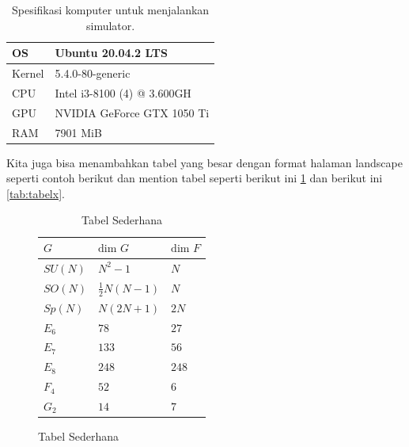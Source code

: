 \begin{longtable}{|p{2cm}|p{7cm}|}
    \caption{Spesifikasi komputer untuk menjalankan simulator.}
    \label{tab:spekPC} \\
    \hline
    OS     & Ubuntu 20.04.2 LTS             \\ \hline
    Kernel & 5.4.0-80-generic               \\ \hline
    CPU    & Intel i3-8100 (4) @ 3.600GH    \\ \hline
    GPU    & NVIDIA GeForce GTX 1050 Ti     \\ \hline
    RAM    & 7901 MiB                       \\ \hline
\end{longtable}

Kita juga bisa menambahkan tabel yang besar dengan format halaman landscape seperti contoh berikut dan mention tabel seperti berikut ini \cref{tab:landscape} dan berikut ini \cref{tab:tabelx}.
\begin{figure}
	\begin{table}[H]
		\caption{Tabel Sederhana}
		\label{tab:landscape}
		\begin{center}
			\begin{tabularx}{0.8\textwidth} {
					|>{\raggedright\arraybackslash}X
					|>{\raggedright\arraybackslash}X
					|>{\raggedright\arraybackslash}X
					|}
				\hline
				$G$     & $\text{dim }G$      & $\text{dim }F$ \\
				\hline
				$SU(N)$ & $N^2 -1$            & $N$            \\
				$SO(N)$ & $\frac{1}{2}N(N-1)$ & $N$            \\
				$Sp(N)$ & $N(2N+1)$           & $2N$           \\
				$E_6$   & $78$                & $27$           \\
				$E_7$   & $133$               & $56$           \\
				$E_8$   & $248$               & $248$          \\
				$F_4$   & $52$                & $6$            \\
				$G_2$   & $14$                & $7$            \\
				\hline
			\end{tabularx}
		\end{center}
	\end{table}
\end{figure}

